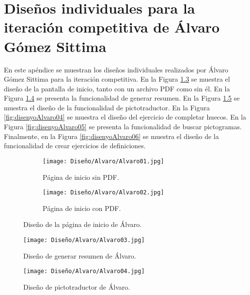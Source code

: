 \chapter{Diseños individuales para la iteración competitiva de Álvaro Gómez Sittima}
\label{ape:disenyoAlvaro}
En este apéndice se muestran los diseños individuales realizados por Álvaro Gómez Sittima para la iteración competitiva. En la Figura \ref{fig:disenyoAlvaro01} se muestra el diseño de la pantalla de inicio, tanto con un archivo PDF como sin él. En la Figura \ref{fig:disenyoAlvaro02} se presenta la funcionalidad de generar resumen. En la Figura \ref{fig:disenyoAlvaro03} se muestra el diseño de la funcionalidad de pictotraductor. En la Figura \ref{fig:disenyoAlvaro04} se muestra el diseño del ejercicio de completar huecos. En la Figura \ref{fig:disenyoAlvaro05} se presenta la funcionalidad de buscar pictogramas. Finalmente, en la Figura \ref{fig:disenyoAlvaro06} se muestra el diseño de la funcionalidad de crear ejercicios de definiciones.

\begin{figure}[ht!]
  \centering

  \begin{subfigure}{\textwidth}
    \centering
    \texttt{[image: Diseño/Alvaro/Alvaro01.jpg]}
    \caption{Página de inicio sin PDF.}
    \label{fig:disenyoAlvaro01a}
  \end{subfigure}

  \begin{subfigure}{\textwidth}
    \centering
    \texttt{[image: Diseño/Alvaro/Alvaro02.jpg]}
    \caption{Página de inicio con PDF.}
    \label{fig:disenyoAlvaro01b}
  \end{subfigure}

  \caption{Diseño de la página de inicio de Álvaro.}
  \label{fig:disenyoAlvaro01}
\end{figure}

\begin{figure}[ht!]
  \centering
  \texttt{[image: Diseño/Alvaro/Alvaro03.jpg]}
  \caption{Diseño de generar resumen de Álvaro.}
  \label{fig:disenyoAlvaro02}
\end{figure}

\begin{figure}[ht!]
  \centering
  \texttt{[image: Diseño/Alvaro/Alvaro04.jpg]}
  \caption{Diseño de pictotraductor de Álvaro.}
  \label{fig:disenyoAlvaro03}
\end{figure}

